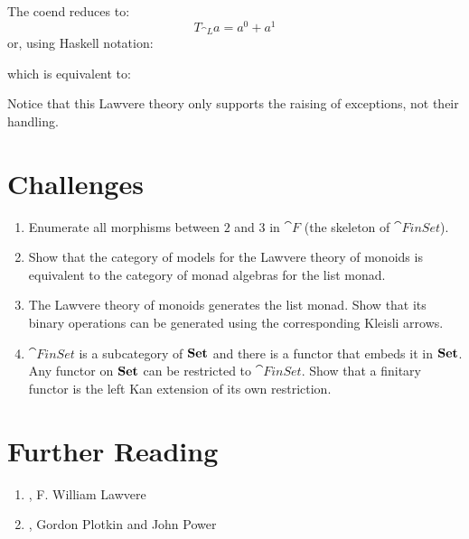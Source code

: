 \begin{figure}[H]
	\centering
\end{figure}

\noindent
The coend reduces to:
\[T_{\cat{L}} a = a^0 + a^1\]
or, using Haskell notation:

which is equivalent to:

Notice that this Lawvere theory only supports the raising of exceptions,
not their handling.

\section{Challenges}

\begin{enumerate}
	\tightlist
	\item
	      Enumerate all morphisms between $2$ and $3$ in $\cat{F}$ (the skeleton of
	      $\cat{FinSet}$).
	\item
	      Show that the category of models for the Lawvere theory of monoids is
	      equivalent to the category of monad algebras for the list monad.
	\item
	      The Lawvere theory of monoids generates the list monad. Show that its
	      binary operations can be generated using the corresponding Kleisli
	      arrows.
	\item
	      $\cat{FinSet}$ is a subcategory of $\mathbf{Set}$ and there is a
	      functor that embeds it in $\mathbf{Set}$. Any functor on $\mathbf{Set}$
	      can be restricted to $\cat{FinSet}$. Show that a finitary functor is
	      the left Kan extension of its own restriction.
\end{enumerate}

\section{Further Reading}
\begin{enumerate}
	\tightlist
	\item
	      , F. William Lawvere
	\item
	      , Gordon Plotkin and John Power
\end{enumerate}
